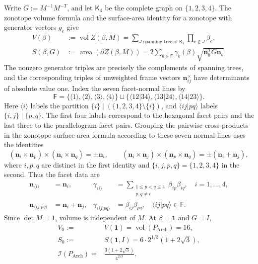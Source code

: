 \documentclass[11pt]{article}
\newcommand{\vol}{\operatorname{vol}}
\newcommand{\area}{\operatorname{area}}
\newcommand{\Arch}{P_{\mathrm{Arch}}}
\newcommand{\Ical}{\mathcal I}
\newcommand{\mb}[1]{\mathbf{#1}}
\newcommand{\K}{\mathsf K}
\newcommand{\F}{\mathsf F}
\newcommand{\br}[1]{\langle{#1}\rangle}
\theoremstyle{remark}
\begin{document}
Write $G:=M^{-1}M^{-T}$, and let $\K_4$ be the complete graph on
$\{1,2,3,4\}$.  The zonotope volume formula \cite{Shephard1974} and the
surface-area identity for a zonotope with generator vectors $g_e$
\cite{Langi2022} give
\begin{equation}\label{eq:zonotope-formulas}
\begin{aligned}
 V(\beta)&:=\vol Z(\beta,M)
 =\sum_{J\text{ spanning tree of }\K_4}\prod_{e\notin J}\beta_e,\\
 S(\beta,G)&:=\area(\partial Z(\beta,M))
 =2\sum_{b\in\F}\gamma_b(\beta)\sqrt{\mb n_b^TG\mb n_b}.
\end{aligned}
\end{equation}
The nonzero generator triples are precisely the complements of spanning trees, and the
corresponding triples of unweighted frame vectors $\mb n_{ij}^{\times}$ have determinants
of absolute value one.  Index the seven facet-normal lines by
\[
 \F=\{\br{1},\br{2},\br{3},\br{4}\}
 \sqcup\{\br{12|34},\br{13|24},\br{14|23}\}.
\]
Here $\br{i}$ labels the partition $\{i\}\mid(\{1,2,3,4\}\setminus\{i\})$, and
$\br{ij|pq}$ labels $\{i,j\}\mid\{p,q\}$.  
The first four labels correspond to the hexagonal facet pairs and the
last three to the parallelogram facet pairs.
Grouping the pairwise
cross products in the zonotope surface-area formula according to these seven normal lines
uses the identities
\[
 (\mb n_i\times\mb n_p)\times(\mb n_i\times\mb n_q)=\pm\mb n_i,
 \qquad
 (\mb n_i\times\mb n_j)\times(\mb n_p\times\mb n_q)
   =\pm(\mb n_i+\mb n_j),
\]
where $i,p,q$ are distinct in the first identity and $\{i,j,p,q\}=\{1,2,3,4\}$ in the
second.  Thus the facet data are
\begin{equation}\label{eq:facet-data}
\begin{aligned}
 \mb n_{\br{i}}&=\mb n_i,
 &\gamma_{\br{i}}&=\sum_{\substack{1\le p<q\le4\\p,q\ne i}}
                         \beta_{ip}\beta_{iq},
 \quad i=1,\ldots,4,\\
 \mb n_{\br{ij|pq}}&=\mb n_i+\mb n_j,
 &\gamma_{\br{ij|pq}}&=\beta_{ij}\beta_{pq},
 \quad \br{ij|pq}\in\F.
\end{aligned}
\end{equation}
Since $\det M=1$, volume is independent of $M$.  At $\beta=\mb{1}$ and $G=I$,
\[
\begin{aligned}
 V_0:={}&V(\mb{1})=\vol(\Arch)=16,\\
 S_0:={}&S(\mb{1},I)=6\cdot 2^{1/3}(1+2\sqrt3),\\
 \Ical(\Arch)={}&\frac{3(1+2\sqrt3)}{4^{2/3}}.
\end{aligned}
\]
\end{document}
